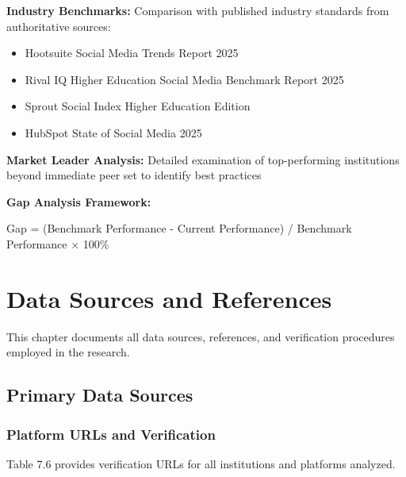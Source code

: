 \documentclass[12pt]{report}
\begin{document}
\textbf{Industry Benchmarks:} Comparison with published industry standards from authoritative sources:
\begin{itemize}
\item Hootsuite Social Media Trends Report 2025
\item Rival IQ Higher Education Social Media Benchmark Report 2025
\item Sprout Social Index Higher Education Edition
\item HubSpot State of Social Media 2025
\end{itemize}

\textbf{Market Leader Analysis:} Detailed examination of top-performing institutions beyond immediate peer set to identify best practices

\textbf{Gap Analysis Framework:}

Gap = (Benchmark Performance - Current Performance) / Benchmark Performance × 100\%

\chapter{Data Sources and References}

This chapter documents all data sources, references, and verification procedures employed in the research.

\section{Primary Data Sources}

\subsection{Platform URLs and Verification}

Table 7.6 provides verification URLs for all institutions and platforms analyzed.
\end{document}
